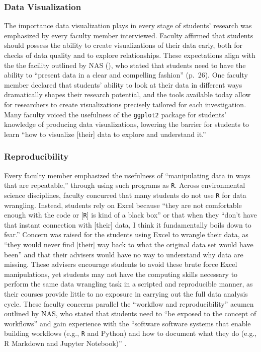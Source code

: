 \documentclass[12pt]{article}
\begin{document}
\subsubsection{Data Visualization} 

\quad The importance data visualization plays in every stage of students'
research was emphasized by every faculty member interviewed. Faculty affirmed
that students should possess the ability to create visualizations of their data
early, both for checks of data quality and to explore relationships. These 
expectations align with the the facility outlined by NAS (\citeyear{nas}), who
stated that students need to have the ability to ``present data in a clear and
compelling fashion'' (p.\ 26). One faculty member declared that students'
ability to look at their data in different ways dramatically shapes their
research potential, and the tools available today allow for researchers to
create visualizations precisely tailored for each investigation. Many faculty
voiced the usefulness of the \texttt{ggplot2} \citep{ggplot} package for
students' knowledge of producing data visualizations, lowering the barrier for
students to learn ``how to visualize [their] data to explore and understand
it.'' 

\subsubsection{Reproducibility}  

\quad Every faculty member emphasized the usefulness of ``manipulating data in
ways that are repeatable,'' through using such programs as \texttt{R}. Across
environmental science disciplines, faculty concurred that many students do not
use \texttt{R} for data wrangling. Instead, students rely on Excel because 
``they are not comfortable enough with the code or [\texttt{R}] is kind of a 
black box'' or that when they ``don't have that instant connection with [their]
data, I think it fundamentally boils down to fear.'' Concern was raised for the
students using Excel to wrangle their data, as ``they would never find [their]
way back to what the original data set would have been'' and that their advisers
would have no way to understand why data are missing. These advisers encourage
students to avoid these brute force Excel manipulations, yet students may not
have the computing skills necessary to perform the same data wrangling task in a
scripted and reproducible manner, as their courses provide little to no exposure
in carrying out the full data analysis cycle. These faculty concerns parallel 
the ``workflow and reproducibility'' acumen outlined by NAS, who stated that 
students need to ``be exposed to the concept of workflows'' and gain experience
with the ``software software systems that enable building workflows (e.g., 
\texttt{R} and Python) and how to document what they do (e.g., R Markdown and 
Jupyter Notebook)'' \citep[p.\ 28]{nas}. 
\end{document}
